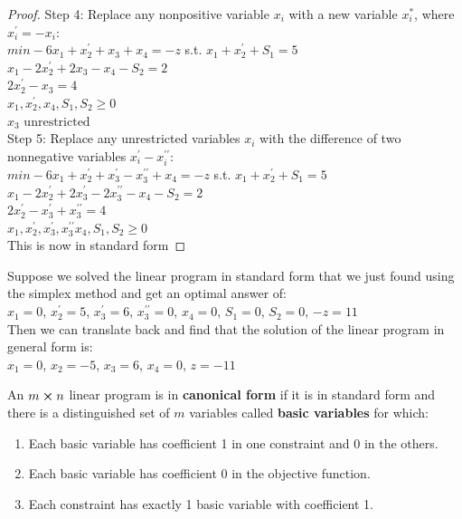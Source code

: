 \documentclass{article}
\begin{document}
\begin{proof}
    Step 4: Replace any nonpositive variable \(x_i\) with a new variable 
    \(x_i^*\), where \(x_i^{\prime} =-x_i\): \\
    \(min \text{} -6x_1+x_2^{\prime} +x_3+x_4=-z\)
    s.t. \(x_1+x_2^{\prime} +S_1=5\) \\
    \(x_1-2x_2^{\prime} +2x_3-x_4-S_2=2\) \\
    \(2x_2^{\prime} -x_3=4\) \\
    \(x_1, x_2^{\prime}, x_4, S_1, S_2 \geq 0\) \\
    \(x_3 \text{ unrestricted}\) \\

    Step 5: Replace any unrestricted variables \(x_i\) with the difference of two 
    nonnegative variables \(x_i^{\prime} -x_i^{\prime\prime} \): \\
    \(min \text{} -6x_1+x_2^{\prime} +x_3^{\prime} -x_3^{\prime\prime} +x_4=-z\)
    s.t. \(x_1+x_2^{\prime} +S_1=5\) \\
    \(x_1-2x_2^{\prime} +2x_3^{\prime} -2x_3^{\prime\prime} -x_4-S_2=2\) \\
    \(2x_2^{\prime} -x_3^{\prime} +x_3^{\prime\prime} =4\) \\
    \(x_1, x_2^{\prime}, x_3^{\prime} , x_3^{\prime\prime} x_4, S_1, S_2 \geq 0\) \\

    This is now in standard form

\end{proof}

\begin{note}
    Suppose we solved the linear program in standard form that we just found 
    using the simplex method and get an optimal answer of: \\
    \(x_1=0\), \(x_2^{\prime} =5\), 
    \(x_3^{\prime} =6\), \(x_3^{\prime\prime} =0\), \(x_4=0\), \(S_1=0\), \(S_2=0\), 
    \(-z=11\)\\
    Then we can translate back and find that the solution of the linear 
    program in general form is: \\
    \(x_1=0\), \(x_2=-5\), \(x_3=6\), \(x_4=0\), \(z=-11\)     
\end{note}

\begin{definition}
    An \(m\cross n\) linear program is in \textbf{canonical form} if it is 
    in standard form and there is a distinguished set of \(m\) variables called 
    \textbf{basic variables} for which: \\
    \begin{enumerate}
        \item Each basic variable has coefficient 1 in one constraint and 0 
        in the others. 
        \item Each basic variable has coefficient 0 in the objective function. 
        \item Each constraint has exactly 1 basic variable with coefficient 1.
    \end{enumerate}
\end{definition}
\end{document}
